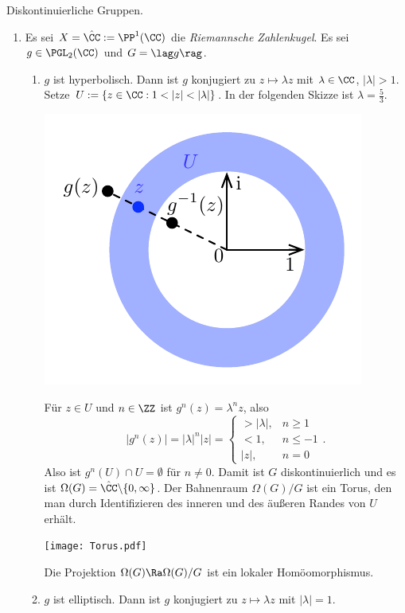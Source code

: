 \BSP Diskontinuierliche Gruppen.
\begin{enumerate}
\item Es sei $X=\hat{\CC}:=\PP^1(\CC)$ die
\emph{Riemannsche Zahlenkugel}.
Es sei $g\in\PGL_2(\CC)$ und $G=\lag g\rag$.
\begin{enumerate}
\item $g$ ist hyperbolisch.
Dann ist $g$ konjugiert zu $z\mapsto \lambda z$ mit $\lambda\in\CC$,
$|\lambda|>1$.
Setze $U:=\{z\in\CC : 1<|z|<|\lambda| \}$.
In der folgenden Skizze ist $\lambda=\frac{5}{3}$.
\begin{center}
	\includegraphics{grugraImages/UinC}
\end{center}
Für $z\in U$ und $n\in\ZZ$ ist $g^n(z)=\lambda^n z$,
also
\[
|g^n(z)|=|\lambda|^n |z|=
\left\{
\begin{matrix}
>|\lambda|, & n\geq 1 \\
< 1, & n\leq -1 \\
|z|, & n=0
\end{matrix}
\right..
\]
Also ist $g^n(U)\cap U=\emptyset$ für $n\neq 0$.
Damit ist $G$ diskontinuierlich und es ist
$\Omega(G)=\hat{\CC}\backslash\{0,\infty\}$.
Der Bahnenraum $\Omega(G)/G$ ist ein Torus, den man durch
Identifizieren des inneren und des äußeren Randes von $U$
erhält.
\begin{center}
	\texttt{[image: Torus.pdf]}
\end{center}
Die Projektion $\Omega(G)\Ra\Omega(G)/G$ ist ein
lokaler Homöomorphismus.
\item $g$ ist elliptisch.
Dann ist $g$ konjugiert zu $z\mapsto\lambda z$ mit $|\lambda|=1$.\\

\end{enumerate}
\end{enumerate}
